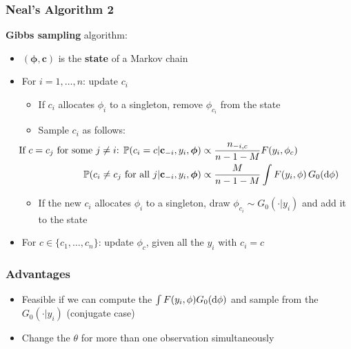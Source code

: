 \begin{frame} %
	\frametitle{Neal's Algorithm 2}
	\textbf{Gibbs sampling} algorithm:
	\begin{itemize}
		\item $(\boldsymbol\phi, \mathbf c)$ is the \textbf{state} of a Markov chain
	    \item For $i= 1,\dots,n$: update $c_{i}$
	    \begin{itemize}
	        \item If $c_{i}$ allocates $\phi_i$ to a singleton, remove $\phi_{c_{i}}$ from the state
		    \item Sample $c_i$ as follows:
	        \begin{align*}
		        \hspace{-35pt}
                \text{If $c=c_j$ for some $j\neq i$: } \PP(c_{i}=c | \mathbf c_{-i}, y_{i},\boldsymbol\phi) &\propto \frac{n_{-i,c}}{n-1-M} F(y_{i},\phi_{c}) \\
                \PP(c_{i}\neq c_{j} \text{ for all } j | \mathbf c_{-i}, y_{i},\boldsymbol\phi) &\propto \frac{M }{n-1-M} \int F(y_{i},\phi) \, G_0(\de\phi)
            \end{align*}
            \item If the new $c_{i}$ allocates $\phi_i$ to a singleton, draw $\phi_{c_{i}} \sim G_0(\cdot|y_i)$ and add it to the state
        \end{itemize} 
        
       	\item For $c \in \{c_{1},\dots,c_{n}\}$: update $\phi_{c}$, given all the $y_{i}$ with $c_{i}=c$
	\end{itemize}
		
\end{frame}


\begin{frame}
	\frametitle{Advantages}
	\begin{itemize}
	    \item Feasible if we can compute the $\int F(y_i,\phi) G_0(\mathrm d\phi)$ and sample from the $G_0(\cdot|y_i)$ (conjugate case)
	    \item Change the $\theta$ for more than one observation simultaneously
	\end{itemize}
\end{frame}


